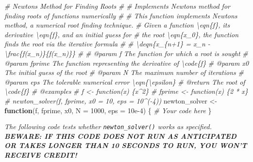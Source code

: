 \documentclass[
]{article}
\newenvironment{Shaded}{\begin{snugshade}}{\end{snugshade}}
\newcommand{\AttributeTok}[1]{\textcolor[rgb]{0.77,0.63,0.00}{#1}}
\newcommand{\CommentTok}[1]{\textcolor[rgb]{0.56,0.35,0.01}{\textit{#1}}}
\newcommand{\ControlFlowTok}[1]{\textcolor[rgb]{0.13,0.29,0.53}{\textbf{#1}}}
\newcommand{\DecValTok}[1]{\textcolor[rgb]{0.00,0.00,0.81}{#1}}
\newcommand{\FloatTok}[1]{\textcolor[rgb]{0.00,0.00,0.81}{#1}}
\newcommand{\NormalTok}[1]{#1}
\newcommand{\OtherTok}[1]{\textcolor[rgb]{0.56,0.35,0.01}{#1}}
\begin{document}
\begin{Shaded}
\begin{Highlighting}[]
\CommentTok{\#\textquotesingle{} Newton\textquotesingle{}s Method for Finding Roots}
\CommentTok{\#\textquotesingle{}}
\CommentTok{\#\textquotesingle{} Implements Newton\textquotesingle{}s method for finding roots of functions numerically}
\CommentTok{\#\textquotesingle{}}
\CommentTok{\#\textquotesingle{} This function implements Newton\textquotesingle{}s method, a numerical root finding technique.}
\CommentTok{\#\textquotesingle{} Given a function \textbackslash{}eqn\{f\}, its derivative \textbackslash{}eqn\{f\textquotesingle{}\}, and an initial guess for}
\CommentTok{\#\textquotesingle{} the root \textbackslash{}eqn\{x\_0\}, the function finds the root via the iterative formula}
\CommentTok{\#\textquotesingle{}}
\CommentTok{\#\textquotesingle{} \textbackslash{}deqn\{x\_\{n+1\} = x\_n {-} \textbackslash{}frac\{f(x\_n)\}\{f\textquotesingle{}(x\_n)\}\}}
\CommentTok{\#\textquotesingle{}}
\CommentTok{\#\textquotesingle{} @param f The function for which a root is sought}
\CommentTok{\#\textquotesingle{} @param fprime The function representing the derivative of \textbackslash{}code\{f\}}
\CommentTok{\#\textquotesingle{} @param x0 The initial guess of the root}
\CommentTok{\#\textquotesingle{} @param N The maximum number of iterations}
\CommentTok{\#\textquotesingle{} @param eps The tolerable numerical error \textbackslash{}eqn\{\textbackslash{}epsilon\}}
\CommentTok{\#\textquotesingle{} @return The root of \textbackslash{}code\{f\}}
\CommentTok{\#\textquotesingle{} @examples}
\CommentTok{\#\textquotesingle{} f \textless{}{-} function(x) \{x\^{}2\}}
\CommentTok{\#\textquotesingle{} fprime \textless{}{-} function(x) \{2 * x\}}
\CommentTok{\#\textquotesingle{} newton\_solver(f, fprime, x0 = 10, eps = 10\^{}({-}4))}
\NormalTok{newton\_solver }\OtherTok{\textless{}{-}} \ControlFlowTok{function}\NormalTok{(f, fprime, x0, }\AttributeTok{N =} \DecValTok{1000}\NormalTok{, }\AttributeTok{eps =} \FloatTok{10e{-}4}\NormalTok{) \{}
  \CommentTok{\# Your code here}
\NormalTok{\}}
\end{Highlighting}
\end{Shaded}

\emph{The following code tests whether \texttt{newton\_solver()} works
as specified. \textbf{BEWARE: IF THIS CODE DOES NOT RUN AS ANTICIPATED
OR TAKES LONGER THAN 10 SECONDS TO RUN, YOU WON'T RECEIVE CREDIT!}}
\end{document}
